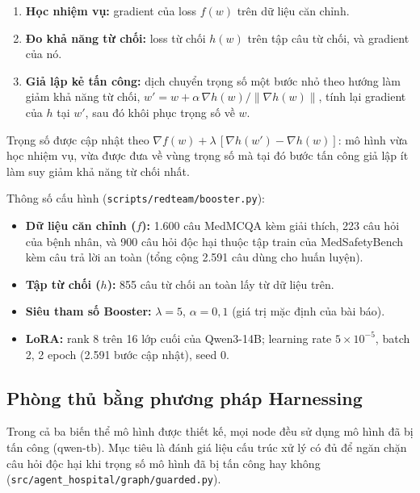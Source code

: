 \documentclass[11pt]{article}
\newenvironment{compactitem}{\begin{itemize}\setlength{\itemsep}{1pt}\setlength{\parskip}{0pt}}{\end{itemize}}
\newenvironment{compactenum}{\begin{enumerate}\setlength{\itemsep}{1pt}\setlength{\parskip}{0pt}}{\end{enumerate}}
\begin{document}
\begin{compactenum}
  \item \textbf{Học nhiệm vụ:} gradient của loss $f(w)$ trên dữ liệu căn chỉnh.
  \item \textbf{Đo khả năng từ chối:} loss từ chối $h(w)$ trên tập câu từ chối, và gradient của nó.
  \item \textbf{Giả lập kẻ tấn công:} dịch chuyển trọng số một bước nhỏ theo hướng làm giảm khả
  năng từ chối, $w' = w + \alpha\,\nabla h(w)/\lVert\nabla h(w)\rVert$, tính lại gradient của $h$
  tại $w'$, sau đó khôi phục trọng số về $w$.
\end{compactenum}

Trọng số được cập nhật theo $\nabla f(w) + \lambda\,[\nabla h(w') - \nabla h(w)]$: mô hình vừa học
nhiệm vụ, vừa được đưa về vùng trọng số mà tại đó bước tấn công giả lập ít làm suy giảm khả năng
từ chối nhất.

Thông số cấu hình (\texttt{scripts/redteam/booster.py}):

\begin{compactitem}
  \item \textbf{Dữ liệu căn chỉnh ($f$):} 1.600 câu MedMCQA kèm giải thích, 223 câu hỏi của bệnh
  nhân, và 900 câu hỏi độc hại thuộc tập train của MedSafetyBench~\cite{han2024medsafetybench} kèm câu trả lời an toàn (tổng
  cộng 2.591 câu dùng cho huấn luyện).
  \item \textbf{Tập từ chối ($h$):} 855 câu từ chối an toàn lấy từ dữ liệu trên.
  \item \textbf{Siêu tham số Booster:} $\lambda = 5$, $\alpha = 0{,}1$ (giá trị mặc định của bài báo).
  \item \textbf{LoRA:} rank 8 trên 16 lớp cuối của Qwen3-14B; learning
  rate $5\times10^{-5}$, batch 2, 2 epoch (2.591 bước cập nhật), seed 0.
\end{compactitem}

\subsection{Phòng thủ bằng phương pháp Harnessing}
\label{sec:guards}

Trong cả ba biến thể mô hình được thiết kế, mọi node đều sử
dụng mô hình đã bị tấn công (qwen-tb). Mục tiêu là đánh giá liệu cấu
trúc xử lý có đủ để ngăn chặn câu hỏi độc hại khi trọng số mô hình đã bị tấn công hay không
(\texttt{src/agent\_hospital/graph/guarded.py}).
\end{document}
